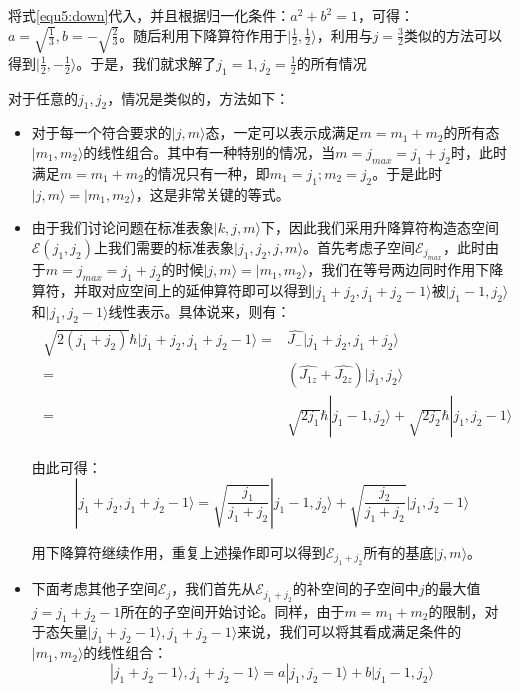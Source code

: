 将式\eqref{equ5:down}代入，并且根据归一化条件：$a^2+b^2=1$，可得：$a=\sqrt{\frac{1}{3}},b=-\sqrt{\frac{2}{3}}$。随后利用下降算符作用于$|\frac{1}{2},\frac{1}{2}\rangle$，利用与$j=\frac{3}{2}$类似的方法可以得到$|\frac{1}{2},-\frac{1}{2}\rangle$。于是，我们就求解了$j_1=1,j_2=\frac{1}{2}$的所有情况

对于任意的$j_1,j_2$，情况是类似的，方法如下：
\begin{itemize}
    \item 对于每一个符合要求的$|j,m\rangle$态，一定可以表示成满足$m=m_1+m_2$的所有态$|m_1,m_2\rangle$的线性组合。其中有一种特别的情况，当$m=j_{max}=j_1+j_2$时，此时满足$m=m_1+m_2$的情况只有一种，即$m_1=j_1;m_2=j_2$。于是此时$|j,m\rangle=|m_1,m_2\rangle$，这是非常关键的等式。
    \item 由于我们讨论问题在标准表象$|k,j,m\rangle$下，因此我们采用升降算符构造态空间$\mathcal{E}(j_1,j_2)$上我们需要的标准表象$|j_1,j_2,j,m\rangle$。首先考虑子空间$\mathcal{E}_{j_{max}}$，此时由于$m=j_{max}=j_1+j_2$的时候$|j,m\rangle=|m_1,m_2\rangle$，我们在等号两边同时作用下降算符，并取对应空间上的延伸算符即可以得到$|j_1+j_2,j_1+j_2-1\rangle$被$|j_1-1,j_2\rangle$和$|j_1,j_2-1\rangle$线性表示。具体说来，则有：
    \begin{align}
        \begin{split}
            \sqrt{2(j_1+j_2)}\hbar|j_1+j_2,j_1+j_2-1\rangle=&\hat{J_{-}}|j_1+j_2,j_1+j_2\rangle\\
            =&(\widehat{J_{1z}}+\widehat{J_{2z}})|j_1,j_2\rangle\\
            =&\sqrt{2j_1}\hbar|j_1-1,j_2\rangle+\sqrt{2j_2}\hbar|j_1,j_2-1\rangle
        \end{split}
    \end{align}
    
    由此可得：
    \begin{equation}
        |j_1+j_2,j_1+j_2-1\rangle=\sqrt{\frac{j_1}{j_1+j_2}}|j_1-1,j_2\rangle+\sqrt{\frac{j_2}{j_1+j_2}}|j_1,j_2-1\rangle
    \end{equation}

    用下降算符继续作用，重复上述操作即可以得到$\mathcal{E}_{j_1+j_2}$所有的基底$|j,m\rangle$。
    \item 下面考虑其他子空间$\mathcal{E}_j$，我们首先从$\mathcal{E}_{j_1+j_2}$的补空间的子空间中$j$的最大值$j=j_1+j_2-1$所在的子空间开始讨论。同样，由于$m=m_1+m_2$的限制，对于态矢量$|j_1+j_2-1\rangle,j_1+j_2-1\rangle$来说，我们可以将其看成满足条件的$|m_1,m_2\rangle$的线性组合：
    \begin{equation}
        |j_1+j_2-1\rangle,j_1+j_2-1\rangle=a|j_1,j_2-1\rangle+b|j_1-1,j_2\rangle
    \end{equation}
    

\end{itemize}
